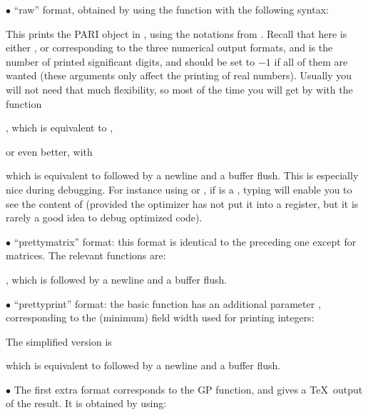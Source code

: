 \noindent $\bullet$ ``raw'' format, obtained by using the function
 with the following syntax:


\noindent
This prints the PARI object  in  , using the
notations from . Recall that here  is either
,  or  corresponding to the three numerical output
formats, and  is the number of printed significant digits, and should
be set to $-1$ if all of them are wanted (these arguments only affect the
printing of real numbers). Usually you will not need that much flexibility,
so most of the time you will get by with the function

, which is equivalent to ,

\noindent or even better, with

 which is equivalent to 
followed by a newline and a buffer flush. This is especially nice during
debugging. For instance using  or , if  is a
, typing  will enable you to see the
content of  (provided the optimizer has not put it into a
register, but it is rarely a good idea to debug optimized code).

\noindent $\bullet$ ``prettymatrix'' format: this format is identical to the
preceding one except for matrices. The relevant functions are:


, which is followed by a newline and a buffer flush.

\noindent $\bullet$ ``prettyprint'' format: the basic function has an
additional parameter , corresponding to the (minimum) field width
used for printing integers:


\noindent The simplified version is

 which is equivalent to
 followed by a newline and a buffer flush.

\noindent $\bullet$ The first extra format corresponds to the 
GP function, and gives a \TeX\ output of the result. It is obtained by
using:


